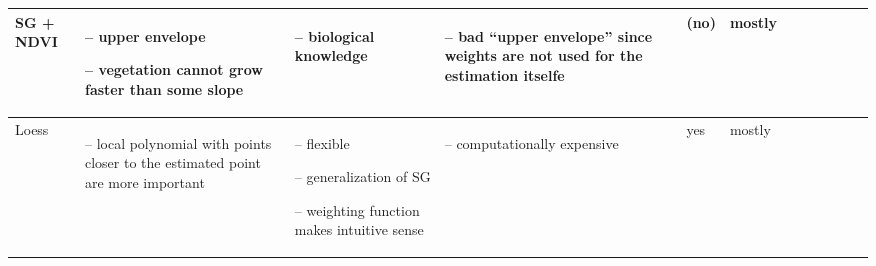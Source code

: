 \begin{table}[!ht]
\begin{tabular}{p{1.6cm}p{3.3cm}p{3.3cm}p{3.3cm}p{0.4cm}p{0.4cm}p{3cm}p{3cm}p{3cm}p{3cm}p{3cm}p{3cm}|}
		SG + NDVI                                                                                                                                                    &
		\begin{cptitemize} \item[--]  upper envelope \item[--]  vegetation cannot grow faster than some slope                                \end{cptitemize}        &
		\begin{cptitemize} \item[--]  biological knowledge                                                                            \end{cptitemize}               &
		\begin{cptitemize} \item[--]  bad ``upper envelope'' since weights are not used for the estimation itselfe                    \end{cptitemize}               &
		(no)                                                                                                                                                         &
		mostly                                                                                                                                                         \\ \hline%

		Loess                                                                                                                                                        &
		\begin{cptitemize} \item[--]  local  polynomial with points closer to the estimated point are more important                  \end{cptitemize}               &
		\begin{cptitemize} \item[--]  flexible \item[--]  generalization of SG \item[--]  weighting function makes intuitive sense                  \end{cptitemize} &
		\begin{cptitemize} \item[--]  computationally expensive                                                                       \end{cptitemize}               &
		yes                                                                                                                                                          &
		mostly                                                                                                                                                         \\ \hline%


\end{tabular}
\end{table}
